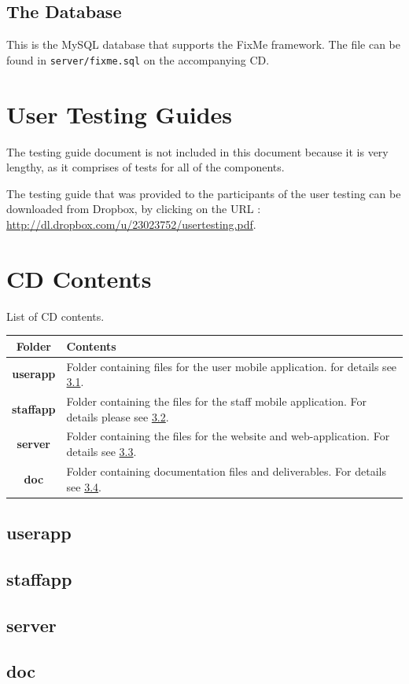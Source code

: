\documentclass[12pt]{ecsproject}     %
\begin{document}
\section{The Database}
This is the MySQL database that supports the FixMe framework. The file can be found in \texttt{server/fixme.sql} on the accompanying CD.



\chapter{User Testing Guides}
The testing guide document is not included in this document because it is very lengthy, as it comprises of tests for all of the components. 

The testing guide that was provided to the participants of the user testing can be downloaded from Dropbox, by clicking on the URL : \\ \href{http://dl.dropbox.com/u/23023752/usertesting.pdf}{http://dl.dropbox.com/u/23023752/usertesting.pdf}.
\label{app:testing}


\chapter{CD Contents}
List of CD contents.
\begin{table}[th]
\begin{tabular}{c | p{12cm}}
\large{\textbf{Folder}} & \large{\textbf{Contents}} \\
\hline
\textbf{userapp} & Folder containing files for the user mobile application. for details see \ref{sec:userdir}.\\
\hline
\textbf{staffapp} & Folder containing the files for the staff mobile application. For details please see \ref{sec:staffdir}. \\
\hline
\textbf{server} & Folder containing the files for the website and web-application. For details see \ref{sec:srvdir}.\\
\hline
\textbf{doc} & Folder containing documentation files and deliverables. For details see \ref{sec:docdir}.\\
\hline
\end{tabular}
\end{table}

\section{userapp}
\label{sec:userdir}

\section{staffapp}
\label{sec:staffdir}

\section{server}
\label{sec:srvdir}

\section{doc}
\label{sec:docdir}
\end{document}
